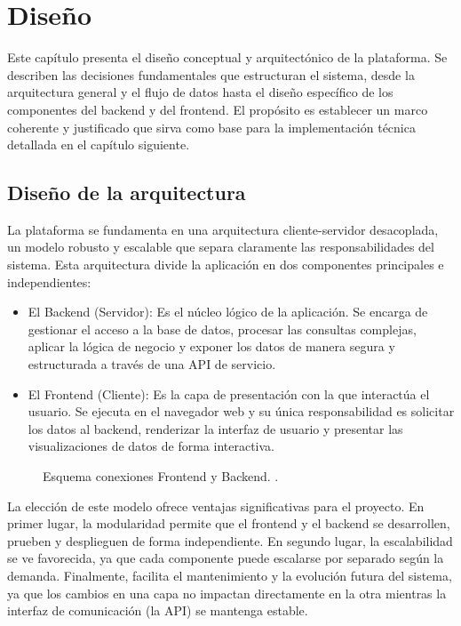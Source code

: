 \chapter{Diseño}

Este capítulo presenta el diseño conceptual y arquitectónico de la plataforma. Se describen las decisiones fundamentales que estructuran el sistema, desde la arquitectura general y el flujo de datos hasta el diseño específico de los componentes del backend y del frontend. El propósito es establecer un marco coherente y justificado que sirva como base para la implementación técnica detallada en el capítulo siguiente.

\section{Diseño de la arquitectura}

La plataforma se fundamenta en una arquitectura cliente-servidor desacoplada, un modelo robusto y escalable que separa claramente las responsabilidades del sistema. Esta arquitectura divide la aplicación en dos componentes principales e independientes:

\begin{itemize}
    \item El Backend (Servidor): Es el núcleo lógico de la aplicación. Se encarga de gestionar el acceso a la base de datos, procesar las consultas complejas, aplicar la lógica de negocio y exponer los datos de manera segura y estructurada a través de una API de servicio.
    \item El Frontend (Cliente): Es la capa de presentación con la que interactúa el usuario. Se ejecuta en el navegador web y su única responsabilidad es solicitar los datos al backend, renderizar la interfaz de usuario y presentar las visualizaciones de datos de forma interactiva.
\end{itemize}

\begin{figure}[H]
    \centering
    \caption{Esquema conexiones Frontend y Backend. \cite{backfrontendfoto}.}
\end{figure}




La elección de este modelo ofrece ventajas significativas para el proyecto. En primer lugar, la modularidad permite que el frontend y el backend se desarrollen, prueben y desplieguen de forma independiente. En segundo lugar, la escalabilidad se ve favorecida, ya que cada componente puede escalarse por separado según la demanda. Finalmente, facilita el mantenimiento y la evolución futura del sistema, ya que los cambios en una capa no impactan directamente en la otra mientras la interfaz de comunicación (la API) se mantenga estable.


